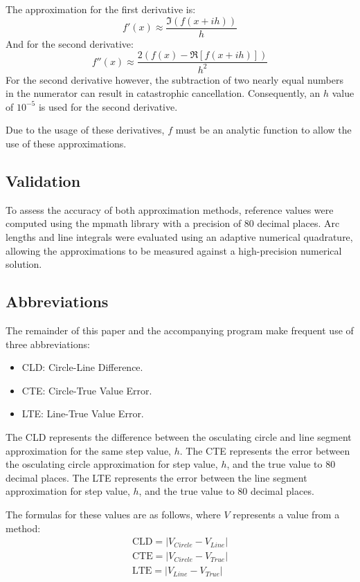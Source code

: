 \documentclass{article}
\begin{document}
The approximation for the first derivative is:
\[
f'(x) \approx \frac{\Im(f(x+ih))}{h}
\]
And for the second derivative:
\[
f''(x) \approx \frac{2(f(x)-\Re[f(x+ih)])}{h^2}
\]
For the second derivative however, the subtraction of two nearly equal numbers in the numerator can result in catastrophic cancellation. Consequently, an $h$ value of $10^{-5}$ is used for the second derivative.

Due to the usage of these derivatives, $f$ must be an analytic function to allow the use of these approximations.

\subsection{Validation}

To assess the accuracy of both approximation methods, reference values were computed using the mpmath library with a precision of 80 decimal places. Arc lengths and line integrals were evaluated using an adaptive numerical quadrature, allowing the approximations to be measured against a high-precision numerical solution.

\subsection{Abbreviations}
The remainder of this paper and the accompanying program make frequent use of three abbreviations:
\begin{itemize}
\item CLD: Circle-Line Difference.
\item CTE: Circle-True Value Error.
\item LTE: Line-True Value Error.
\end{itemize}
The CLD represents the difference between the osculating circle and line segment approximation for the same step value, $h$.
The CTE represents the error between the osculating circle approximation for step value, $h$, and the true value to 80 decimal places.
The LTE represents the error between the line segment approximation for step value, $h$, and the true value to 80 decimal places.

The formulas for these values are as follows, where $V$ represents a value from a method:
\begin{gather*}
\mathrm{CLD} = |V_{Circle}-V_{Line}| \\
\mathrm{CTE} = |V_{Circle}-V_{True}| \\
\mathrm{LTE} = |V_{Line}-V_{True}|
\end{gather*}
\end{document}
